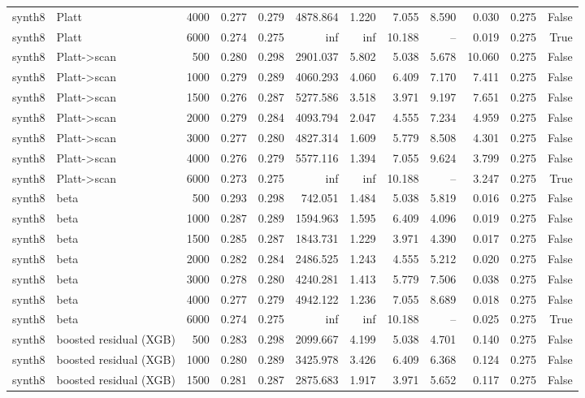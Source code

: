 \begin{tabular}{llrrrrrrrrrr}
synth8 & Platt & 4000 & 0.277 & 0.279 & 4878.864 & 1.220 & 7.055 & 8.590 & 0.030 & 0.275 & False \\
synth8 & Platt & 6000 & 0.274 & 0.275 & inf & inf & 10.188 & -- & 0.019 & 0.275 & True \\
synth8 & Platt->scan & 500 & 0.280 & 0.298 & 2901.037 & 5.802 & 5.038 & 5.678 & 10.060 & 0.275 & False \\
synth8 & Platt->scan & 1000 & 0.279 & 0.289 & 4060.293 & 4.060 & 6.409 & 7.170 & 7.411 & 0.275 & False \\
synth8 & Platt->scan & 1500 & 0.276 & 0.287 & 5277.586 & 3.518 & 3.971 & 9.197 & 7.651 & 0.275 & False \\
synth8 & Platt->scan & 2000 & 0.279 & 0.284 & 4093.794 & 2.047 & 4.555 & 7.234 & 4.959 & 0.275 & False \\
synth8 & Platt->scan & 3000 & 0.277 & 0.280 & 4827.314 & 1.609 & 5.779 & 8.508 & 4.301 & 0.275 & False \\
synth8 & Platt->scan & 4000 & 0.276 & 0.279 & 5577.116 & 1.394 & 7.055 & 9.624 & 3.799 & 0.275 & False \\
synth8 & Platt->scan & 6000 & 0.273 & 0.275 & inf & inf & 10.188 & -- & 3.247 & 0.275 & True \\
synth8 & beta & 500 & 0.293 & 0.298 & 742.051 & 1.484 & 5.038 & 5.819 & 0.016 & 0.275 & False \\
synth8 & beta & 1000 & 0.287 & 0.289 & 1594.963 & 1.595 & 6.409 & 4.096 & 0.019 & 0.275 & False \\
synth8 & beta & 1500 & 0.285 & 0.287 & 1843.731 & 1.229 & 3.971 & 4.390 & 0.017 & 0.275 & False \\
synth8 & beta & 2000 & 0.282 & 0.284 & 2486.525 & 1.243 & 4.555 & 5.212 & 0.020 & 0.275 & False \\
synth8 & beta & 3000 & 0.278 & 0.280 & 4240.281 & 1.413 & 5.779 & 7.506 & 0.038 & 0.275 & False \\
synth8 & beta & 4000 & 0.277 & 0.279 & 4942.122 & 1.236 & 7.055 & 8.689 & 0.018 & 0.275 & False \\
synth8 & beta & 6000 & 0.274 & 0.275 & inf & inf & 10.188 & -- & 0.025 & 0.275 & True \\
synth8 & boosted residual (XGB) & 500 & 0.283 & 0.298 & 2099.667 & 4.199 & 5.038 & 4.701 & 0.140 & 0.275 & False \\
synth8 & boosted residual (XGB) & 1000 & 0.280 & 0.289 & 3425.978 & 3.426 & 6.409 & 6.368 & 0.124 & 0.275 & False \\
synth8 & boosted residual (XGB) & 1500 & 0.281 & 0.287 & 2875.683 & 1.917 & 3.971 & 5.652 & 0.117 & 0.275 & False \\

\end{tabular}
